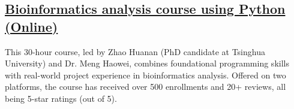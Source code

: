 \subsection*{\href{https://www.bioinfo.info/p/t_pc/goods_pc_detail/goods_detail/course_2SvfNlIVzrKfOcexHk9Nute5Bhd}{Bioinformatics analysis course using Python (Online)}}

This 30-hour course, led by Zhao Huanan (PhD candidate at Tsinghua University) and Dr. Meng Haowei, 
combines foundational programming skills with real-world project experience in bioinformatics analysis. 
Offered on two platforms, the course has received over 500 enrollments and 20+ reviews, all being 5-star ratings (out of 5).